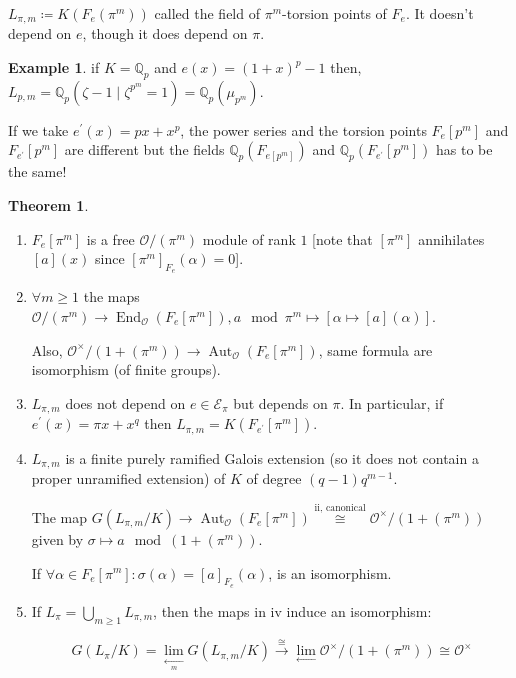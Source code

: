 \documentclass{article}
\theoremstyle{definition}
\newtheorem*{example}{Example}
\newtheorem{theorem}{Theorem}
\numberwithin{theorem}{subsection}
\begin{document}
    \(L_{\pi, m}\coloneqq K(F_e(\pi^m))\) called the field of \(\pi^m\)-torsion points of \(F_e\). It doesn't depend on \(e\), though it does depend on \(\pi\).

    \begin{example}
        if \(K=\mathbb{Q}_p\) and \(e(x) = (1+x)^p - 1\) then, \(L_{p,m} = \mathbb{Q}_p(\zeta - 1 \mid \zeta^{p^m} = 1) = \mathbb{Q}_{p}(\mu_{p^m})\).

        If we take \(e^{\prime}(x) = px + x^p\), the power series and the torsion points \(F_e[p^m]\) and \(F_{e^{\prime}}[p^m]\) are different but the fields \(\mathbb{Q}_{p}(F_{e[p^m]})\) and \(\mathbb{Q}_{p}(F_{e^{\prime}}[p^m])\)  has to be the same!
    \end{example}

    \begin{theorem}
        \begin{enumerate}[label=\roman*)]
            \item \(F_e[\pi^m]\) is a free \(\mathcal{O} / (\pi^m)\) module of rank \(1\) [note that \([\pi^m]\) annihilates \([a](x)\) since \([\pi^m]_{F_e}(\alpha) = 0\)].
            \item \(\forall m \geq 1\) the maps \(\mathcal{O} / (\pi^m) \to \operatorname{End}_{\mathcal{O}}(F_e[\pi^m]), a \mod \pi^m \mapsto [\alpha \mapsto [a](\alpha)]\).
            
            Also, \(\mathcal{O}^\times / (1+(\pi^m)) \to \operatorname{Aut}_{\mathcal{O}}(F_e[\pi^m])\), same formula are isomorphism (of finite groups).

            \item \(L_{\pi, m}\) does not depend on \(e\in \mathscr{E}_{\pi}\) but depends on \(\pi\). In particular, if \(e^{\prime} (x) = \pi x + x^q\) then \(L_{\pi,m}=K(F_{e^{\prime}}[\pi^m])\). 
            
            \item \(L_{\pi,m}\) is a finite purely ramified Galois extension (so it does not contain a proper unramified extension) of \(K\) of degree \((q-1)q^{m-1}\).
            
            The map \(G(L_{\pi,m} / K) \to \operatorname{Aut}_{\mathcal{O}}(F_e[\pi^m]) \overset{\text{ii, canonical}}{\cong} \mathcal{O}^\times / (1 + (\pi^m))\) given by \(\sigma \mapsto a \mod (1+(\pi^m))\).
            
            If \(\forall \alpha \in F_e[\pi^m]\colon \sigma (\alpha) = [a]_{F_e}(\alpha)\), is an isomorphism.

            \item If \(L_\pi = \bigcup_{m \geq 1} L_{\pi, m}\), then the maps in iv induce an isomorphism:
            
            \[
                G(L_\pi / K) = \lim_{\xleftarrow[m]{}} G(L_{\pi,m} / K) \xrightarrow[]{\cong} \lim_{\leftarrow} \mathcal{O}^\times / (1 + (\pi^m)) \cong \mathcal{O}^\times
            \]
        \end{enumerate} 
    \end{theorem}
\end{document}
